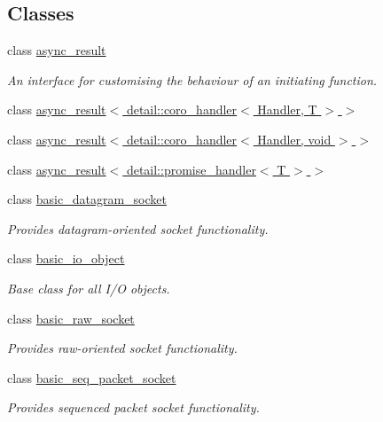 \subsection*{Classes}
\begin{DoxyCompactItemize}
\item 
class \hyperlink{classasio_1_1async__result}{async\+\_\+result}
\begin{DoxyCompactList}\small\item\em An interface for customising the behaviour of an initiating function. \end{DoxyCompactList}\item 
class \hyperlink{classasio_1_1async__result_3_01detail_1_1coro__handler_3_01_handler_00_01_t_01_4_01_4}{async\+\_\+result$<$ detail\+::coro\+\_\+handler$<$ Handler, T $>$ $>$}
\item 
class \hyperlink{classasio_1_1async__result_3_01detail_1_1coro__handler_3_01_handler_00_01void_01_4_01_4}{async\+\_\+result$<$ detail\+::coro\+\_\+handler$<$ Handler, void $>$ $>$}
\item 
class \hyperlink{classasio_1_1async__result_3_01detail_1_1promise__handler_3_01_t_01_4_01_4}{async\+\_\+result$<$ detail\+::promise\+\_\+handler$<$ T $>$ $>$}
\item 
class \hyperlink{classasio_1_1basic__datagram__socket}{basic\+\_\+datagram\+\_\+socket}
\begin{DoxyCompactList}\small\item\em Provides datagram-\/oriented socket functionality. \end{DoxyCompactList}\item 
class \hyperlink{classasio_1_1basic__io__object}{basic\+\_\+io\+\_\+object}
\begin{DoxyCompactList}\small\item\em Base class for all I/\+O objects. \end{DoxyCompactList}\item 
class \hyperlink{classasio_1_1basic__raw__socket}{basic\+\_\+raw\+\_\+socket}
\begin{DoxyCompactList}\small\item\em Provides raw-\/oriented socket functionality. \end{DoxyCompactList}\item 
class \hyperlink{classasio_1_1basic__seq__packet__socket}{basic\+\_\+seq\+\_\+packet\+\_\+socket}
\begin{DoxyCompactList}\small\item\em Provides sequenced packet socket functionality. \end{DoxyCompactList}\item 

\end{DoxyCompactItemize}
